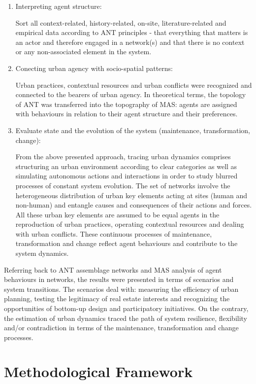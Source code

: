 \documentclass[11pt]{report}
\begin{document}
\begin{enumerate}
\item Interpreting agent structure:

Sort all context-related, history-related, on-site, literature-related and empirical data according to ANT principles - that everything that matters is an actor and therefore engaged in a network(s) and that there is no context or any non-associated element in the system. 

\item Conecting urban agency with socio-spatial patterns:

Urban practices, contextual resources and urban conflicts were recognized and connected to the bearers of urban agency.
In theoretical terms, the topology of ANT was transferred into the topography of MAS: agents are assigned with behaviours in relation to their agent structure and their preferences.

\item Evaluate state and the evolution of the system (maintenance, transformation, change):

From the above presented approach, tracing urban dynamics comprises structuring an urban environment according to clear categories as well as simulating autonomous actions and interactions in order to study blurred processes of constant system evolution.
The set of networks involve the heterogeneous distribution of urban key elements acting at sites (human and non-human) and entangle causes and consequences of their actions and forces.
All these urban key elements are assumed to be equal agents in the reproduction of urban practices, operating contextual resources and dealing with urban conflicts. These continuous processes of maintenance, transformation and change reflect agent behaviours and contribute to the system dynamics.
\end{enumerate}

Referring back to ANT assemblage networks and MAS analysis of agent behaviours in networks, the results were presented in terms of scenarios and system transitions. The scenarios deal with: measuring the efficiency of urban planning, testing the legitimacy of real estate interests and recognizing the opportunities of bottom-up design and participatory initiatives. On the contrary, the estimation of urban dynamics traced the path of system resilience, flexibility and/or contradiction in terms of the maintenance, transformation and change processes.

\section{Methodological Framework}
\end{document}
